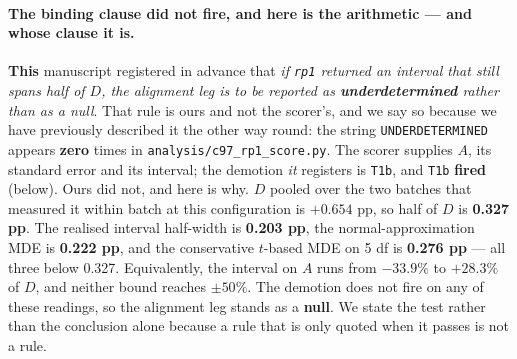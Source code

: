 \documentclass[10pt,letterpaper]{article}
\newcommand{\Dstat}{D}                         %
\newcommand{\Astat}{A}                         %
\newcommand{\arm}[1]{\texttt{#1}}
\begin{document}
\paragraph{The binding clause did not fire, and here is the arithmetic --- and whose clause it
is.}
\textbf{This} manuscript registered in advance that \emph{if \arm{rp1} returned an interval that
still spans half of $\Dstat$, the alignment leg is to be reported as \textbf{underdetermined}
rather than as a null}. That rule is ours and not the scorer's, and we say so because we have
previously described it the other way round: the string \texttt{UNDERDETERMINED} appears
\textbf{zero} times in \texttt{analysis/c97\_rp1\_score.py}. The scorer supplies $\Astat$, its
standard error and its interval; the demotion \emph{it} registers is \texttt{T1b}, and
\texttt{T1b} \textbf{fired} (below). Ours did not, and here is why.
$\Dstat$ pooled over the two batches that measured it within batch at this configuration is
$+0.654$ pp, so half of $\Dstat$ is \textbf{0.327 pp}. The realised interval half-width is
\textbf{0.203 pp}, the normal-approximation MDE is \textbf{0.222 pp}, and the conservative
$t$-based MDE on 5 df is \textbf{0.276 pp} --- all three below 0.327. Equivalently, the interval on
$\Astat$ runs from $-33.9\%$ to $+28.3\%$ of $\Dstat$, and neither bound reaches $\pm 50\%$. The
demotion does not fire on any of these readings, so the alignment leg stands as a \textbf{null}. We
state the test rather than the conclusion alone because a rule that is only quoted when it passes
is not a rule.
\end{document}
